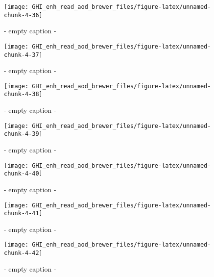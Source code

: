 \documentclass[
  10pt,
  a4paper,oneside]{article}
\begin{document}
\begin{figure}[H]

{\centering \texttt{[image: GHI\_enh\_read\_aod\_brewer\_files/figure-latex/unnamed-chunk-4-36]} 

}

\caption{ - empty caption - }\label{fig:unnamed-chunk-4-36}
\end{figure}
\begin{figure}[H]

{\centering \texttt{[image: GHI\_enh\_read\_aod\_brewer\_files/figure-latex/unnamed-chunk-4-37]} 

}

\caption{ - empty caption - }\label{fig:unnamed-chunk-4-37}
\end{figure}
\begin{figure}[H]

{\centering \texttt{[image: GHI\_enh\_read\_aod\_brewer\_files/figure-latex/unnamed-chunk-4-38]} 

}

\caption{ - empty caption - }\label{fig:unnamed-chunk-4-38}
\end{figure}
\begin{figure}[H]

{\centering \texttt{[image: GHI\_enh\_read\_aod\_brewer\_files/figure-latex/unnamed-chunk-4-39]} 

}

\caption{ - empty caption - }\label{fig:unnamed-chunk-4-39}
\end{figure}
\begin{figure}[H]

{\centering \texttt{[image: GHI\_enh\_read\_aod\_brewer\_files/figure-latex/unnamed-chunk-4-40]} 

}

\caption{ - empty caption - }\label{fig:unnamed-chunk-4-40}
\end{figure}
\begin{figure}[H]

{\centering \texttt{[image: GHI\_enh\_read\_aod\_brewer\_files/figure-latex/unnamed-chunk-4-41]} 

}

\caption{ - empty caption - }\label{fig:unnamed-chunk-4-41}
\end{figure}
\begin{figure}[H]

{\centering \texttt{[image: GHI\_enh\_read\_aod\_brewer\_files/figure-latex/unnamed-chunk-4-42]} 

}

\caption{ - empty caption - }\label{fig:unnamed-chunk-4-42}
\end{figure}
\end{document}
